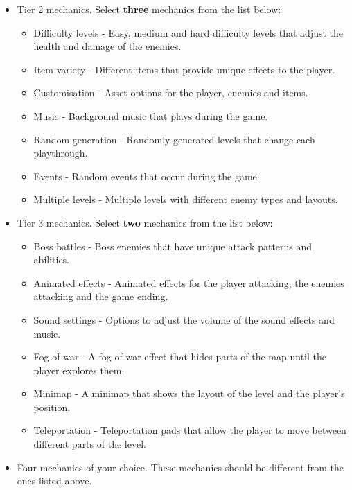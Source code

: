 \documentclass{article}
\begin{document}
\begin{itemize}
    \item Tier 2 mechanics. Select \textbf{three} mechanics from the list below:
    \begin{itemize}
        \item Difficulty levels - Easy, medium and hard difficulty levels that adjust the health and damage of the enemies.
        \item Item variety - Different items that provide unique effects to the player.
        \item Customisation - Asset options for the player, enemies and items.
        \item Music - Background music that plays during the game.
        \item Random generation - Randomly generated levels that change each playthrough.
        \item Events - Random events that occur during the game.
        \item Multiple levels - Multiple levels with different enemy types and layouts.
    \end{itemize}

    \item Tier 3 mechanics. Select \textbf{two} mechanics from the list below:
    \begin{itemize}
        \item Boss battles - Boss enemies that have unique attack patterns and abilities.
        \item Animated effects - Animated effects for the player attacking, the enemies attacking and the game ending.
        \item Sound settings - Options to adjust the volume of the sound effects and music.
        \item Fog of war - A fog of war effect that hides parts of the map until the player explores them.
        \item Minimap - A minimap that shows the layout of the level and the player's position.
        \item Teleportation - Teleportation pads that allow the player to move between different parts of the level.
    \end{itemize}
    \item Four mechanics of your choice. These mechanics should be different from the ones listed above.
\end{itemize}
\end{document}
